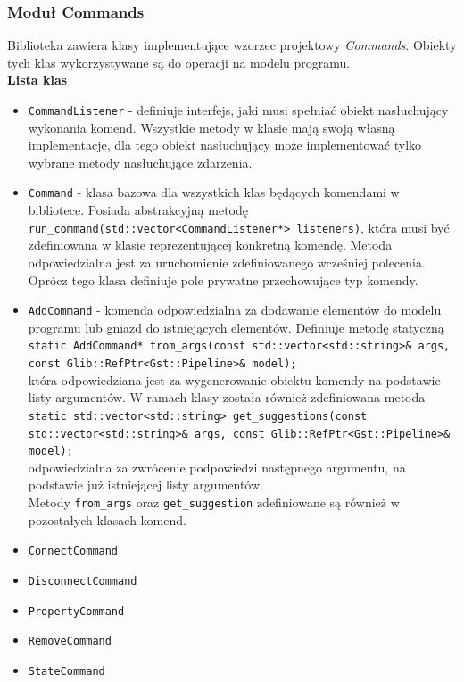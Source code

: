 \documentclass[12pt]{article}
\begin{document}
\subsubsection{Moduł Commands}
Biblioteka zawiera klasy implementujące wzorzec projektowy \textit{Commands}. Obiekty tych klas wykorzystywane są do operacji na modelu programu.\\
\textbf{Lista klas}
\begin{itemize}
 \setlength{\itemsep}{0em}
\item \texttt{CommandListener} - definiuje interfejs, jaki musi spełniać obiekt nasłuchujący wykonania komend. Wszystkie metody w klasie mają swoją własną implementację, dla tego obiekt nasłuchujący może implementować tylko wybrane metody nasłuchujące zdarzenia.
\item \texttt{Command} - klasa bazowa dla wszystkich klas będących komendami w bibliotece. Posiada abstrakcyjną metodę \texttt{run\_command(std::vector<CommandListener*> listeners)}, która musi być zdefiniowana w klasie reprezentującej konkretną komendę. Metoda odpowiedzialna jest za uruchomienie zdefiniowanego wcześniej polecenia. Oprócz tego klasa definiuje pole prywatne przechowujące typ komendy.
\item \texttt{AddCommand} - komenda odpowiedzialna za dodawanie elementów do modelu programu lub gniazd do istniejących elementów. Definiuje metodę statyczną \\
\texttt{static AddCommand* from\_args(const std::vector<std::string>\& args, const Glib::RefPtr<Gst::Pipeline>\& model);}\\
która odpowiedziana jest za wygenerowanie obiektu komendy na podstawie listy argumentów.
W ramach klasy została również zdefiniowana metoda \\
\texttt{static std::vector<std::string> get\_suggestions(const std::vector<std::string>\& args, const Glib::RefPtr<Gst::Pipeline>\& model);}\\
odpowiedzialna za zwrócenie podpowiedzi następnego argumentu, na podstawie już istniejącej listy argumentów.\\
Metody \texttt{from\_args} oraz \texttt{get\_suggestion} zdefiniowane są również w pozostałych klasach komend.
\item \texttt{ConnectCommand} 
\item \texttt{DisconnectCommand} 
\item \texttt{PropertyCommand} 
\item \texttt{RemoveCommand}
\item \texttt{StateCommand}
\end{itemize}
\end{document}
